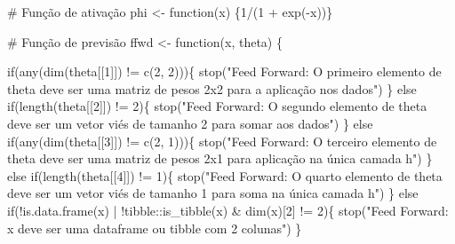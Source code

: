 \documentclass[
  a4paperpaper,
]{article}
\newenvironment{Shaded}{\begin{snugshade}}{\end{snugshade}}
\newcommand{\CommentTok}[1]{\textcolor[rgb]{0.37,0.37,0.37}{#1}}
\newcommand{\ControlFlowTok}[1]{\textcolor[rgb]{0.00,0.23,0.31}{#1}}
\newcommand{\DecValTok}[1]{\textcolor[rgb]{0.68,0.00,0.00}{#1}}
\newcommand{\FunctionTok}[1]{\textcolor[rgb]{0.28,0.35,0.67}{#1}}
\newcommand{\NormalTok}[1]{\textcolor[rgb]{0.00,0.23,0.31}{#1}}
\newcommand{\OtherTok}[1]{\textcolor[rgb]{0.00,0.23,0.31}{#1}}
\newcommand{\SpecialCharTok}[1]{\textcolor[rgb]{0.37,0.37,0.37}{#1}}
\newcommand{\StringTok}[1]{\textcolor[rgb]{0.13,0.47,0.30}{#1}}
\begin{document}
\begin{Shaded}
\begin{Highlighting}[]
\CommentTok{\# Função de ativação}
\NormalTok{phi }\OtherTok{\textless{}{-}} \ControlFlowTok{function}\NormalTok{(x) \{}\DecValTok{1}\SpecialCharTok{/}\NormalTok{(}\DecValTok{1} \SpecialCharTok{+} \FunctionTok{exp}\NormalTok{(}\SpecialCharTok{{-}}\NormalTok{x))\}}

\CommentTok{\# Função de previsão}
\NormalTok{ffwd }\OtherTok{\textless{}{-}} \ControlFlowTok{function}\NormalTok{(x, theta) \{}
  
  \ControlFlowTok{if}\NormalTok{(}\FunctionTok{any}\NormalTok{(}\FunctionTok{dim}\NormalTok{(theta[[}\DecValTok{1}\NormalTok{]]) }\SpecialCharTok{!=} \FunctionTok{c}\NormalTok{(}\DecValTok{2}\NormalTok{, }\DecValTok{2}\NormalTok{)))\{}
    \FunctionTok{stop}\NormalTok{(}\StringTok{"Feed Forward: O primeiro elemento de theta deve ser uma matriz de pesos 2x2 para a aplicação nos dados"}\NormalTok{)}
\NormalTok{  \} }\ControlFlowTok{else} \ControlFlowTok{if}\NormalTok{(}\FunctionTok{length}\NormalTok{(theta[[}\DecValTok{2}\NormalTok{]]) }\SpecialCharTok{!=} \DecValTok{2}\NormalTok{)\{}
    \FunctionTok{stop}\NormalTok{(}\StringTok{"Feed Forward: O segundo elemento de theta deve ser um vetor viés de tamanho 2 para somar aos dados"}\NormalTok{)}
\NormalTok{  \} }\ControlFlowTok{else} \ControlFlowTok{if}\NormalTok{(}\FunctionTok{any}\NormalTok{(}\FunctionTok{dim}\NormalTok{(theta[[}\DecValTok{3}\NormalTok{]]) }\SpecialCharTok{!=} \FunctionTok{c}\NormalTok{(}\DecValTok{2}\NormalTok{, }\DecValTok{1}\NormalTok{)))\{}
    \FunctionTok{stop}\NormalTok{(}\StringTok{"Feed Forward: O terceiro elemento de theta deve ser uma matriz de pesos 2x1 para aplicação na única camada h"}\NormalTok{)}
\NormalTok{  \} }\ControlFlowTok{else} \ControlFlowTok{if}\NormalTok{(}\FunctionTok{length}\NormalTok{(theta[[}\DecValTok{4}\NormalTok{]]) }\SpecialCharTok{!=} \DecValTok{1}\NormalTok{)\{}
    \FunctionTok{stop}\NormalTok{(}\StringTok{"Feed Forward: O quarto elemento de theta deve ser um vetor viés de tamanho 1 para soma na única camada h"}\NormalTok{)}
\NormalTok{  \} }\ControlFlowTok{else} \ControlFlowTok{if}\NormalTok{(}\SpecialCharTok{!}\FunctionTok{is.data.frame}\NormalTok{(x) }\SpecialCharTok{|} \SpecialCharTok{!}\NormalTok{tibble}\SpecialCharTok{::}\FunctionTok{is\_tibble}\NormalTok{(x) }\SpecialCharTok{\&} \FunctionTok{dim}\NormalTok{(x)[}\DecValTok{2}\NormalTok{] }\SpecialCharTok{!=} \DecValTok{2}\NormalTok{)\{}
    \FunctionTok{stop}\NormalTok{(}\StringTok{"Feed Forward: x deve ser uma dataframe ou tibble com 2 colunas"}\NormalTok{)}
\NormalTok{  \}}
  

\end{Highlighting}
\end{Shaded}
\end{document}

